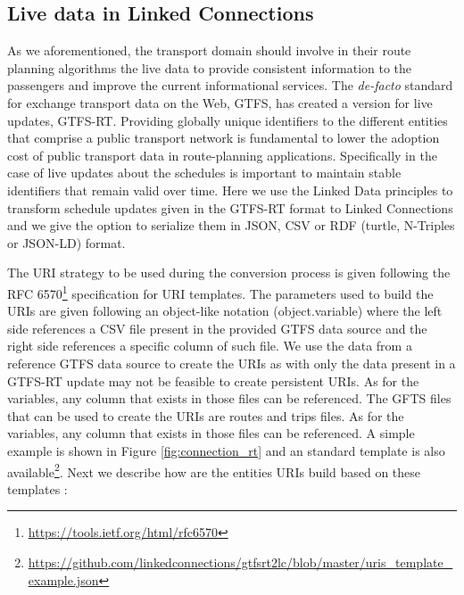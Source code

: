 \documentclass[sw]{iosart2x}
\begin{document}
\subsection{Live data in Linked Connections}\label{real_time_lc}

As we aforementioned, the transport domain should involve in their route planning algorithms the live data to provide consistent information to the passengers and improve the current  informational services.  The \textit{de-facto} standard for exchange transport data on the Web, GTFS, has created a version for live updates, GTFS-RT.  
Providing globally unique identifiers to the different entities that comprise a public transport network is fundamental to lower the adoption cost of public transport data in route-planning applications. Specifically in the case of live updates about the schedules is important to maintain stable identifiers that remain valid over time. Here we use the Linked Data principles to transform schedule updates given in the GTFS-RT format to Linked Connections and we give the option to serialize them in JSON, CSV or RDF (turtle, N-Triples or JSON-LD) format.

The URI strategy to be used during the conversion process is given following the RFC 6570\footnote{\url{https://tools.ietf.org/html/rfc6570}} specification for URI templates. The parameters used to build the URIs are given following an object-like notation (object.variable) where the left side references a CSV file present in the provided GTFS data source and the right side references a specific column of such file. We use the data from a reference GTFS data source to create the URIs as with only the data present in a GTFS-RT update may not be feasible to create persistent URIs. As for the variables, any column that exists in those files can be referenced. The GFTS files that can be used to create the URIs are routes and trips files. As for the variables, any column that exists in those files can be referenced. A simple example is shown in Figure \ref{fig:connection_rt} and an standard template is also available\footnote{\url{https://github.com/linkedconnections/gtfsrt2lc/blob/master/uris_template_example.json}}. Next we describe how are the entities URIs build based on these templates :
\end{document}
